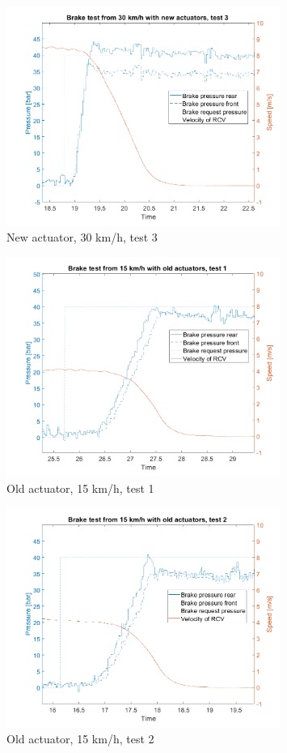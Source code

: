 \documentclass[a4paper,11pt]{kth-mag}
\begin{document}
\begin{figure}[h]
\centering
\includegraphics[width=0.8\textwidth]{New_30kph_test3}
\caption{New actuator, 30 km/h, test 3}
\label{fig:New_30kph_test3}
\end{figure}

\begin{figure}[h]
\centering
\includegraphics[width=0.8\textwidth]{Old_15kph_test1}
\caption{Old actuator, 15 km/h, test 1}
\label{fig:Old_15kph_test1}
\end{figure}

\begin{figure}[h]
\centering
\includegraphics[width=0.8\textwidth]{Old_15kph_test2}
\caption{Old actuator, 15 km/h, test 2}
\label{fig:Old_15kph_test2}
\end{figure}
\end{document}
